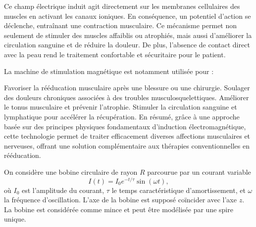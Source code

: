\documentclass[a4paper,10pt]{report}
\begin{document}
Ce champ électrique induit agit directement sur les membranes cellulaires des muscles en activant les canaux ioniques. En conséquence, un potentiel d'action se déclenche, entraînant une contraction musculaire. Ce mécanisme permet non seulement de stimuler des muscles affaiblis ou atrophiés, mais aussi d'améliorer la circulation sanguine et de réduire la douleur. De plus, l'absence de contact direct avec la peau rend le traitement confortable et sécuritaire pour le patient.

La machine de stimulation magnétique est notamment utilisée pour :

Favoriser la rééducation musculaire après une blessure ou une chirurgie.
Soulager des douleurs chroniques associées à des troubles musculosquelettiques.
Améliorer le tonus musculaire et prévenir l'atrophie.
Stimuler la circulation sanguine et lymphatique pour accélérer la récupération.
En résumé, grâce à une approche basée sur des principes physiques fondamentaux d'induction électromagnétique, cette technologie permet de traiter efficacement diverses affections musculaires et nerveuses, offrant une solution complémentaire aux thérapies conventionnelles en rééducation.

		On considère une bobine circulaire de rayon $R$ parcourue par un courant variable
	\[
	I(t) = I_0 e^{-t/\tau} \sin(\omega t),
	\]
	où $I_0$ est l'amplitude du courant, $\tau$ le temps caractéristique d'amortissement, et $\omega$ la fréquence d'oscillation. L'axe de la bobine est supposé coïncider avec l'axe $z$. La bobine est considérée comme mince et peut être modélisée par une spire unique.
	
\end{document}
